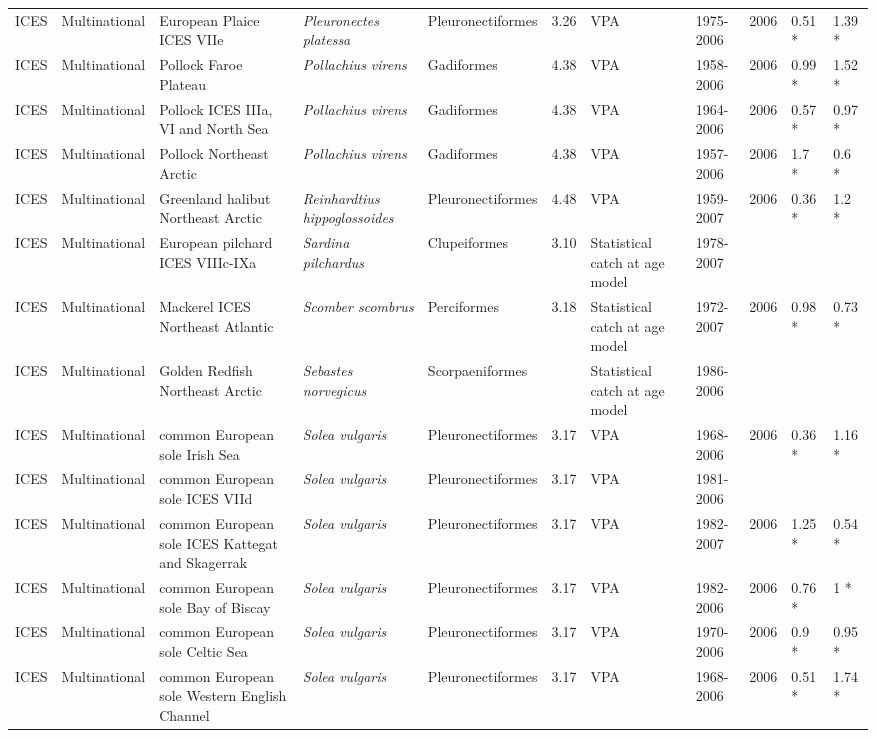 \begin{longtable}{p{1.5cm}p{1.5cm}p{3cm}p{3cm}p{2.5cm}p{0.9cm}p{1.4cm}p{0.9cm}p{0.9cm}p{0.9cm}p{1cm}}
  ICES & Multinational & European Plaice ICES VIIe & \textit{Pleuronectes platessa} & Pleuronectiformes & 3.26 & VPA & 1975-2006 & 2006 & 0.51 * & 1.39 * \\ 
  ICES & Multinational & Pollock Faroe Plateau & \textit{Pollachius virens} & Gadiformes & 4.38 & VPA & 1958-2006 & 2006 & 0.99 * & 1.52 * \\ 
  ICES & Multinational & Pollock ICES IIIa, VI and North Sea & \textit{Pollachius virens} & Gadiformes & 4.38 & VPA & 1964-2006 & 2006 & 0.57 * & 0.97 * \\ 
  ICES & Multinational & Pollock Northeast Arctic & \textit{Pollachius virens} & Gadiformes & 4.38 & VPA & 1957-2006 & 2006 & 1.7 * & 0.6 * \\ 
  ICES & Multinational & Greenland halibut Northeast Arctic & \textit{Reinhardtius hippoglossoides} & Pleuronectiformes & 4.48 & VPA & 1959-2007 & 2006 & 0.36 * & 1.2 * \\ 
  ICES & Multinational & European pilchard ICES VIIIc-IXa & \textit{Sardina pilchardus} & Clupeiformes & 3.10 & Statistical catch at age model & 1978-2007 &  &  &  \\ 
  ICES & Multinational & Mackerel ICES Northeast Atlantic & \textit{Scomber scombrus} & Perciformes & 3.18 & Statistical catch at age model & 1972-2007 & 2006 & 0.98 * & 0.73 * \\ 
  ICES & Multinational & Golden Redfish Northeast Arctic & \textit{Sebastes norvegicus} & Scorpaeniformes &  & Statistical catch at age model & 1986-2006 &  &  &  \\ 
  ICES & Multinational & common European sole Irish Sea & \textit{Solea vulgaris} & Pleuronectiformes & 3.17 & VPA & 1968-2006 & 2006 & 0.36 * & 1.16 * \\ 
  ICES & Multinational & common European sole ICES VIId & \textit{Solea vulgaris} & Pleuronectiformes & 3.17 & VPA & 1981-2006 &  &  &  \\ 
  ICES & Multinational & common European sole ICES Kattegat and Skagerrak & \textit{Solea vulgaris} & Pleuronectiformes & 3.17 & VPA & 1982-2007 & 2006 & 1.25 * & 0.54 * \\ 
  ICES & Multinational & common European sole Bay of Biscay & \textit{Solea vulgaris} & Pleuronectiformes & 3.17 & VPA & 1982-2006 & 2006 & 0.76 * & 1 * \\ 
  ICES & Multinational & common European sole Celtic Sea & \textit{Solea vulgaris} & Pleuronectiformes & 3.17 & VPA & 1970-2006 & 2006 & 0.9 * & 0.95 * \\ 
  ICES & Multinational & common European sole Western English Channel & \textit{Solea vulgaris} & Pleuronectiformes & 3.17 & VPA & 1968-2006 & 2006 & 0.51 * & 1.74 * \\ 

\end{longtable}
